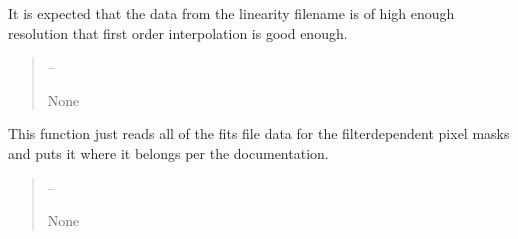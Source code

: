 \documentclass[letterpaper,11pt,english]{sphinxmanual}
\begin{document}
\begin{savenotes}
\begin{fulllineitems}
\begin{savenotes}
\begin{fulllineitems}
\sphinxAtStartPar
It is expected that the data from the linearity filename is of high
enough resolution that first order interpolation is good enough.
\begin{quote}\begin{description}
\sphinxAtStartPar
{} – 

\sphinxAtStartPar
None

\end{description}\end{quote}

\end{fulllineitems}\end{savenotes}


\begin{savenotes}\begin{fulllineitems}
\label{\detokenize{code/opihiexarata.opihi.preprocess:opihiexarata.opihi.preprocess.OpihiPreprocessSolution.__init_read_mask_data}}
\pysigstartsignatures
{}
\pysigstopsignatures
\sphinxAtStartPar
This function just reads all of the fits file data for the
filter\sphinxhyphen{}dependent pixel masks and puts it where it belongs per the
documentation.
\begin{quote}\begin{description}
\sphinxAtStartPar
{} – 

\sphinxAtStartPar
None

\end{description}\end{quote}

\end{fulllineitems}\end{savenotes}



\end{fulllineitems}
\end{savenotes}
\end{document}
